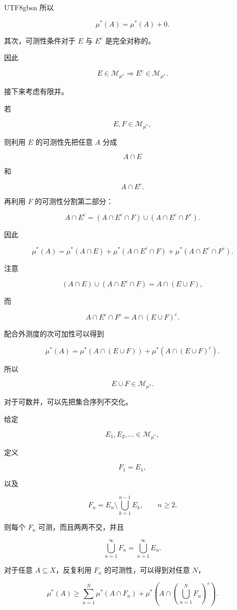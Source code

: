 \documentclass[11pt]{article}
\begin{document}
\begin{CJK*}{UTF8}{gbsn}
所以

\[
\mu^{*}(A)=\mu^{*}(A)+0.
\]

其次，可测性条件对于 $E$ 与 $E^{c}$ 是完全对称的。

因此

\[
E\in\mathcal{M}_{\mu^{*}}\Longrightarrow E^{c}\in\mathcal{M}_{\mu^{*}}.
\]

接下来考虑有限并。

若

\[
E,F\in\mathcal{M}_{\mu^{*}},
\]

则利用 $E$ 的可测性先把任意 $A$ 分成

\[
A\cap E
\]

和

\[
A\cap E^{c}.
\]

再利用 $F$ 的可测性分割第二部分：

\[
A\cap E^{c}=(A\cap E^{c}\cap F)\cup(A\cap E^{c}\cap F^{c}).
\]

因此

\[
\mu^{*}(A)=\mu^{*}(A\cap E)+\mu^{*}(A\cap E^{c}\cap F)+\mu^{*}(A\cap E^{c}\cap F^{c}).
\]

注意

\[
(A\cap E)\cup(A\cap E^{c}\cap F)=A\cap(E\cup F),
\]

而

\[
A\cap E^{c}\cap F^{c}=A\cap(E\cup F)^{c}.
\]

配合外测度的次可加性可以得到

\[
\mu^{*}(A)=\mu^{*}(A\cap(E\cup F))+\mu^{*}(A\cap(E\cup F)^{c}).
\]

所以

\[
E\cup F\in\mathcal{M}_{\mu^{*}}.
\]

对于可数并，可以先把集合序列不交化。

给定

\[
E_{1},E_{2},\ldots\in\mathcal{M}_{\mu^{*}},
\]

定义

\[
F_{1}=E_{1},
\]

以及

\[
F_{n}=E_{n}\setminus\bigcup_{k=1}^{n-1}E_{k},\qquad n\geq2.
\]

则每个 $F_{n}$ 可测，而且两两不交，并且

\[
\bigcup_{n=1}^{\infty}F_{n}=\bigcup_{n=1}^{\infty}E_{n}.
\]

对于任意 $A\subseteq X$，反复利用 $F_{n}$ 的可测性，可以得到对任意 $N$，

\[
\mu^{*}(A)\geq\sum_{n=1}^{N}\mu^{*}(A\cap F_{n})+\mu^{*}\left(A\cap\left(\bigcup_{n=1}^{N}F_{n}\right)^{c}\right).
\]


\end{CJK*}
\end{document}
